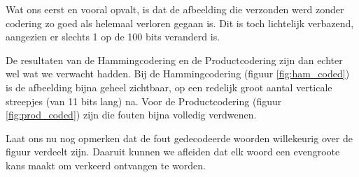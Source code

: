 \documentclass[]{article}
\begin{document}
\begin{section}
\begin{subsection}
        Wat ons eerst en vooral opvalt, is dat de afbeelding die verzonden werd
        zonder codering zo goed als helemaal verloren gegaan is. Dit is toch
        lichtelijk verbazend, aangezien er slechts 1 op de 100 bits veranderd
        is.

        De resultaten van de Hammingcodering en de Productcodering zijn dan
        echter wel wat we verwacht hadden. Bij de Hammingcodering (figuur
        \ref{fig:ham_coded}) is de afbeelding bijna geheel zichtbaar, op een
        redelijk groot aantal verticale streepjes (van 11 bits lang) na. Voor
        de Productcodering (figuur \ref{fig:prod_coded}) zijn die fouten bijna
        volledig verdwenen.

        Laat ons nu nog opmerken dat de fout gedecodeerde woorden willekeurig
        over de figuur verdeelt zijn. Daaruit kunnen we afleiden dat elk
        woord een evengroote kans maakt om verkeerd ontvangen te worden.

        \begin{figure}
            \centering


\end{figure}
\end{subsection}
\end{section}
\end{document}
